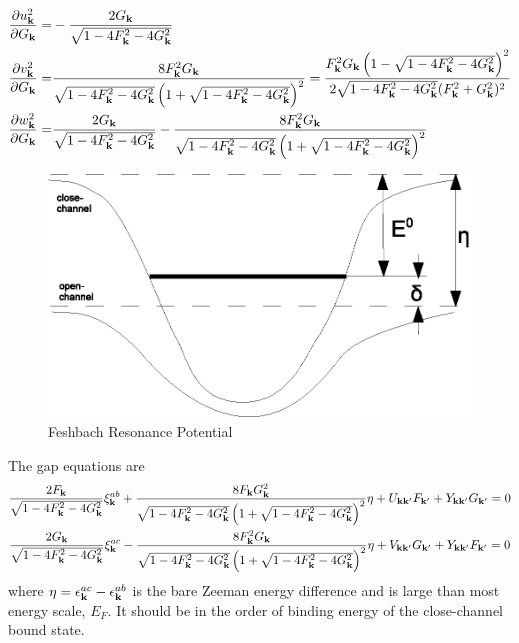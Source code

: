 \documentclass{article}
\begin{document}
\begin{equation}
\begin{split}
\frac{\partial{u_{\ensuremath{\mathbf{k}}}^2}}{\partial{G_{\ensuremath{\mathbf{k}}}}}=&-\frac{2 G_{\mathbf{k}}}{\sqrt{1-4 F_{\mathbf{k}}^2-4 G_{\mathbf{k}}^2}}\\
\frac{\partial{v_{\ensuremath{\mathbf{k}}}^2}}{\partial{G_{\ensuremath{\mathbf{k}}}}}=&\frac{8 F_{\mathbf{k}} ^{2}G_{\mathbf{k}}}{\sqrt{1-4 F_{\mathbf{k}}^2-4 G_{\mathbf{k}}^2} \left(1+\sqrt{1-4 F_{\mathbf{k}}^2-4 G_{\mathbf{k}}^2}\right)^2}
=\frac{F_{\mathbf{k}}^{2}G_{\mathbf{k}} \left(1-\sqrt{1-4 F_{\mathbf{k}}^2-4 G_{\mathbf{k}}^2}\right)^2}{2\sqrt{1-4 F_{\mathbf{k}}^2-4 G_{\mathbf{k}}^2} (F_{\mathbf{k}}^2 + G_{\mathbf{k}}^2)^2}\\
\frac{\partial{w_{\ensuremath{\mathbf{k}}}^2}}{\partial{G_{\ensuremath{\mathbf{k}}}}}=&\frac{2 G_{\mathbf{k}}}{\sqrt{1-4 F_{\mathbf{k}}^2-4 G_{\mathbf{k}}^2}}-\frac{8 F_{\mathbf{k}} ^{2}G_{\mathbf{k}}}{\sqrt{1-4 F_{\mathbf{k}}^2-4 G_{\mathbf{k}}^2} \left(1+\sqrt{1-4 F_{\mathbf{k}}^2-4 G_{\mathbf{k}}^2}\right)^2}
\end{split}
\end{equation}
\begin{figure}[hhtb]
	\centering
		\includegraphics[width=.50\textwidth]{image/FeshbachPotential}
	\caption{Feshbach Resonance Potential\label{fig:FeshbachPotential}}	
\end{figure}

The gap equations are 
\begin{subequations}\label{eq:20100909:fullgap}
\begin{gather}
\frac{2F_{\mathbf{k}}}{\sqrt{1-4 F_{\mathbf{k}}^2-4 G_{\mathbf{k}}^2}} \xi^{ab}_{\mathbf{k}}+\frac{8 F_{\mathbf{k}} G_{\mathbf{k}}^2}{\sqrt{1-4 F_{\mathbf{k}}^2-4 G_{\mathbf{k}}^2} \left(1+\sqrt{1-4 F_{\mathbf{k}}^2-4 G_{\mathbf{k}}^2}\right)^2}\eta+U_{\mathbf{k}\mathbf{k}'}F_{\mathbf{k}'}+Y_{\mathbf{k}\mathbf{k}'}G_{\mathbf{k}'}=0
\label{eq:20100909:fullgapa}\\
\frac{2G_{\mathbf{k}}}{\sqrt{1-4 F_{\mathbf{k}}^2-4 G_{\mathbf{k}}^2}} \xi^{ac}_{\mathbf{k}}-\frac{8 F_{\mathbf{k}}^{2} G_{\mathbf{k}}}{\sqrt{1-4 F_{\mathbf{k}}^2-4 G_{\mathbf{k}}^2} \left(1+\sqrt{1-4 F_{\mathbf{k}}^2-4 G_{\mathbf{k}}^2}\right)^2}\eta+V_{\mathbf{k}\mathbf{k}'}G_{\mathbf{k}'}+Y_{\mathbf{k}\mathbf{k}'}F_{\mathbf{k}'}=0
\label{eq:20100909:fullgapb}
\end{gather}
\end{subequations}
where $\eta=\epsilon^{ac}_{\mathbf{k}}-\epsilon^{ab}_{\mathbf{k}}$ is the bare Zeeman energy difference and is large than most energy scale, $E_{F}$.  It should be in the order of binding energy of the close-channel bound state.   
\end{document}
